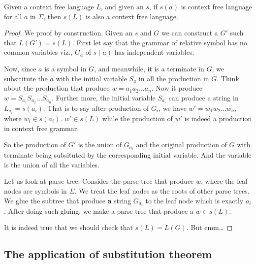 \documentclass[../main]{subfiles}
\begin{document}
\begin{thm}
\label{Closure property under substitution}
	Given a context free language \(L\), and given an \(s\), if \(s (a)\) is context free language for all \(a\) in \( \Sigma\),
	then \(s (L)\) is also a context free language. 
\end{thm}
\begin{proof}
	We proof by construction. Given an \(s\) and \(G\) we can construct a \(G'\) such that 
	\(L (G') = s (L)\). First let say that the grammar of relative symbol has no common variables viz., 
	\(G _{a}\) of \( s (a)\) has independent variables. 
	
	Now, since \(a\) is a symbol in \(G\), and meanwhile, it is a terminate in \(G\), we subsititute the \(a\) with the 
	initial variable \(S_{a}\) in all the production in \(G\). Think about the production that produce \(w = a_1 a_2 \dots a_{n}\). Now it produce 
	\(w = S_{a_1} S_{a_{2}} \dots S_{a _{n}}\). Further more, the initial variable \(S_{a _{i}}\) can produce a 
	string in \(L _{a _{i}} =  s ( a _{i})\). That is to say after production of \(G _{i}\), we have 
	\( w ' =   w_1 w_2 \dots w_{n}\), where \(w _{i} \in s (a _{i})\). \(w ' \in s (L)\) while the production of 
	\(w '\) is indeed a production in context free grammar. 

	So the production of \(G '\) is the union of \(G _{a_{i}}\) and the original production of \(G\) with terminate being 
	subsituted by the corresponding initial variable. And the variable is the union of all the variables. 

	Let us look at parse tree. Consider the parse tree that produce \(w\), where the leaf nodes are symbols in \( \Sigma\). We treat 
	the leaf nodes as the roots of other parse trees. We glue the subtree that produce \textbf{a} string \(G_{a_{i}}\) to the leaf node 
	which is exactly \(a _{i}\). After doing such gluing, we make a parse tree that produce a \(w \in s (L)\). 

	It is indeed true that we should check that \( s (L)= L (G)\). But emm\dots
\end{proof}

\subsection{The application of substitution theorem}
\end{document}
